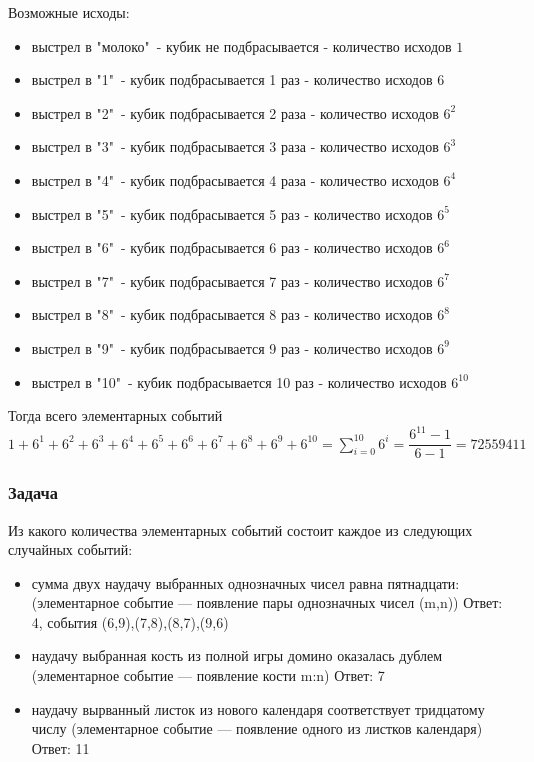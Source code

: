 \documentclass[a4paper,12pt]{article}
\begin{document}
Возможные исходы:
\begin{itemize}
	\item выстрел в "молоко"\ - кубик не подбрасывается - количество исходов \(1\)
	\item выстрел в "1"\ - кубик подбрасывается 1 раз - количество исходов \(6\)
	\item выстрел в "2"\ - кубик подбрасывается 2 раза - количество исходов \(6^2\)
	\item выстрел в "3"\ - кубик подбрасывается 3 раза - количество исходов \(6^3\)
	\item выстрел в "4"\ - кубик подбрасывается 4 раза - количество исходов \(6^4\)
	\item выстрел в "5"\ - кубик подбрасывается 5 раз - количество исходов \(6^5\)
	\item выстрел в "6"\ - кубик подбрасывается 6 раз - количество исходов \(6^6\)
	\item выстрел в "7"\ - кубик подбрасывается 7 раз - количество исходов \(6^7\)
	\item выстрел в "8"\ - кубик подбрасывается 8 раз - количество исходов \(6^8\)
	\item выстрел в "9"\ - кубик подбрасывается 9 раз - количество исходов \(6^9\)
	\item выстрел в "10"\ - кубик подбрасывается 10 раз - количество исходов \(6^{10}\)
\end{itemize}
Тогда всего элементарных событий \(1+6^1+6^2+6^3+6^4+6^5+6^6+6^7+6^8+6^9+6^{10} = \sum_{i=0}^{10}6^i = \dfrac{6^{11}-1}{6-1} = 72559411\)

\subsubsection*{Задача}
Из какого количества элементарных событий состоит каждое из следующих случайных событий:
\begin{itemize}
	\item 
сумма двух наудачу выбранных однозначных чисел равна пятнадцати: (элементарное событие — появление пары однозначных чисел (m,n)) Ответ: 4, события (6,9),(7,8),(8,7),(9,6)
    \item 
наудачу выбранная кость из полной игры домино оказалась дублем (элементарное событие — появление кости m:n) Ответ: 7
	\item 
наудачу вырванный листок из нового календаря соответствует тридцатому числу (элементарное событие — появление одного из листков календаря) Ответ: 11
\end{itemize}
\end{document}
